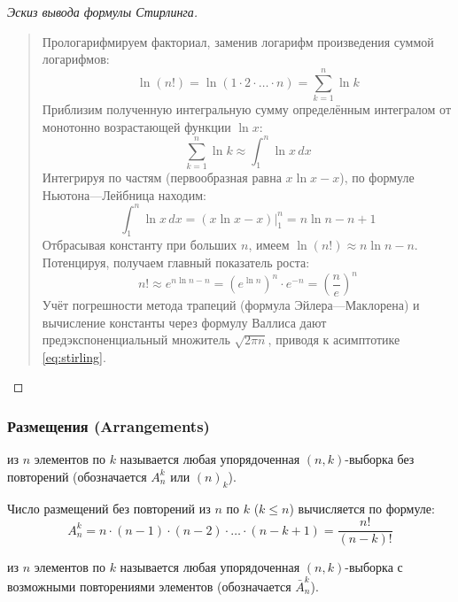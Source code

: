 \begin{proof}[Эскиз вывода формулы Стирлинга]~\\
    \begin{quote}
        Прологарифмируем факториал, заменив логарифм произведения суммой 
        логарифмов:
        \[
            \ln(n!) = \ln(1 \cdot 2 \cdot \dots \cdot n) = \sum_{k=1}^{n} \ln k
        \]
        Приблизим полученную интегральную сумму определённым интегралом от 
        монотонно возрастающей функции $\ln x$:
        \[
            \sum_{k=1}^{n} \ln k \approx \int_{1}^{n} \ln x \, dx
        \]
        Интегрируя по частям (первообразная равна $x \ln x - x$), по 
        формуле Ньютона---Лейбница находим:
        \[
            \int_{1}^{n} \ln x \, dx = (x \ln x - x)\Big|_{1}^{n} = 
            n \ln n - n + 1
        \]
        Отбрасывая константу при больших $n$, имеем $\ln(n!) \approx 
        n \ln n - n$. Потенцируя, получаем главный показатель роста:
        \[
            n! \approx e^{n \ln n - n} = (e^{\ln n})^n \cdot e^{-n} = 
            \left(\frac{n}{e}\right)^n
        \]
        Учёт погрешности метода трапеций (формула Эйлера---Маклорена) и 
        вычисление константы через формулу Валлиса дают предэкспоненциальный 
        множитель $\sqrt{2 \pi n}$, приводя к асимптотике \eqref{eq:stirling}.
    \end{quote}
\end{proof}

\subsubsection{Размещения (Arrangements)}

\begin{definition}
     из $n$ элементов по $k$ называется 
    любая упорядоченная $(n, k)$-выборка без повторений (обозначается 
    $A_n^k$ или $(n)_k$).
\end{definition}

\begin{proposition}
    Число размещений без повторений из $n$ по $k$ ($k \le n$) вычисляется 
    по формуле:
    \begin{equation} \label{eq:arr_no_rep}
        A_n^k = n \cdot (n - 1) \cdot (n - 2) \cdot \dots \cdot (n - k + 1) = 
        \frac{n!}{(n - k)!} \tag{8}
    \end{equation}
\end{proposition}

\begin{definition}
     из $n$ элементов по $k$ называется 
    любая упорядоченная $(n, k)$-выборка с возможными повторениями 
    элементов (обозначается $\bar{A}_n^k$).
\end{definition}

